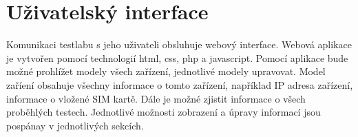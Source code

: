 \chapter{Uživatelský interface}
Komunikaci testlabu s jeho uživateli obsluhuje webový interface. Webová aplikace je vytvořen pomocí technologií html, css, php a javascript. Pomocí aplikace bude možné prohlížet modely všech zařízení, jednotlivé modely upravovat. Model zaříení obsahuje všechny informace o tomto zařízení, například IP adresa zařízení, informace o vložené SIM kartě. Dále je možné  zjistit informace o všech proběhlých testech. Jednotlivé možnosti zobrazení a úpravy informací jsou pospánay v jednotlivých sekcích.



\endinput
